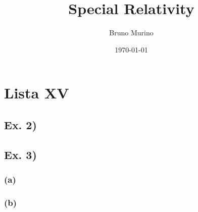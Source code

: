 \documentclass[oneside, 10pt, notitlepage]{book}
\title{Special Relativity} %
\author{Bruno Murino} %
\date{\today} %
\begin{document}
\chapter{Lista XV}


\section*{Ex. 2)}

\section*{Ex. 3)}
\subsection*{(a)}


\subsection*{(b)}
\end{document}
